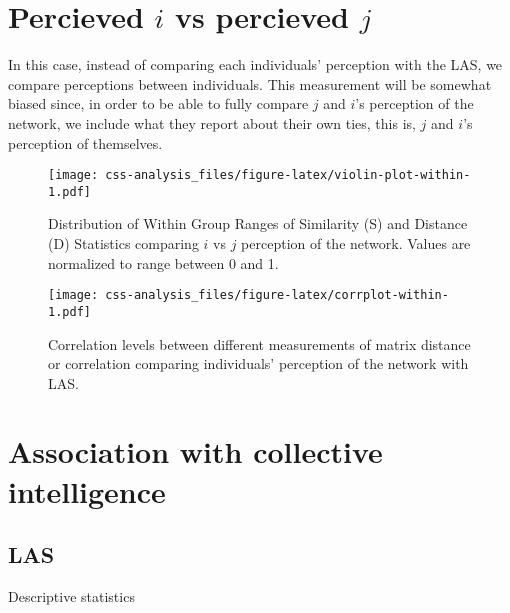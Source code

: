 \documentclass[
]{article}
\begin{document}
\hypertarget{percieved-i-vs-percieved-j}{%
\section{\texorpdfstring{Percieved \(i\) vs percieved
\(j\)}{Percieved i vs percieved j}}\label{percieved-i-vs-percieved-j}}

In this case, instead of comparing each individuals' perception with the
LAS, we compare perceptions between individuals. This measurement will
be somewhat biased since, in order to be able to fully compare \(j\) and
\(i\)'s perception of the network, we include what they report about
their own ties, this is, \(j\) and \(i\)'s perception of themselves.

\begin{figure}
\centering
\texttt{[image: css-analysis\_files/figure-latex/violin-plot-within-1.pdf]}
\caption{Distribution of Within Group Ranges of Similarity (S) and
Distance (D) Statistics comparing \(i\) vs \(j\) perception of the
network. Values are normalized to range between 0 and 1.}
\end{figure}

\begin{figure}
\centering
\texttt{[image: css-analysis\_files/figure-latex/corrplot-within-1.pdf]}
\caption{Correlation levels between different measurements of matrix
distance or correlation comparing individuals' perception of the network
with LAS.}
\end{figure}

\hypertarget{association-with-collective-intelligence}{%
\section{Association with collective
intelligence}\label{association-with-collective-intelligence}}

\hypertarget{las}{%
\subsection{LAS}\label{las}}

Descriptive statistics

\clearpage
\end{document}
